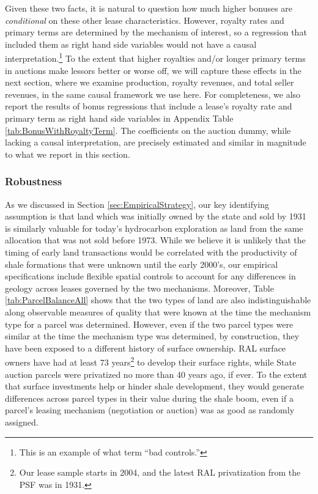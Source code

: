 \documentclass[12pt]{article}
\begin{document}
Given these two facts, it is natural to question how much higher bonuses are \emph{conditional} on these other lease characteristics. However, royalty rates and primary terms are determined by the mechanism of interest, so a regression that included them as right hand side variables would not have a causal interpretation.\footnote{This is an example of what \citet{angrist2008mostly} term ``bad controls.''} To the extent that higher royalties and/or longer primary terms in auctions make lessors better or worse off, we will capture these effects in the next section, where we examine production, royalty revenues, and total seller revenues, in the same causal framework we use here.  For completeness, we also report the results of bonus regressions that include a lease's royalty rate and primary term as right hand side variables in Appendix Table \ref{tab:BonusWithRoyaltyTerm}.  The coefficients on the auction dummy, while lacking a causal interpretation, are precisely estimated and similar in magnitude to what we report in this section. 

\subsubsection*{Robustness \label{sec:BonusRobustness}}
As we discussed in Section \ref{sec:EmpiricalStrategy}, our key identifying assumption is that land which was initially owned by the state and sold by 1931 is similarly valuable for today's hydrocarbon exploration as land from the same allocation that was not sold before 1973. While we believe it is unlikely that the timing of early land transactions would be correlated with the productivity of shale formations that were unknown until the early 2000's, our empirical specifications include flexible spatial controls to account for any differences in geology across leases governed by the two mechanisms.  Moreover, Table \ref{tab:ParcelBalanceAll} shows that the two types of land are also indistinguishable along observable measures of quality that were known at the time the mechanism type for a parcel was determined.  However, even if the two parcel types were similar at the time the mechanism type was determined, by construction, they have been exposed to a different history of surface ownership.  RAL surface owners have had at least 73 years\footnote{Our lease sample starts in 2004, and the latest RAL privatization from the PSF was in 1931.} to develop their surface rights, while State auction parcels were privatized no more than 40 years ago, if ever. To the extent that surface investments help or hinder shale development, they would generate differences across parcel types in their value during the shale boom, even if a parcel's leasing mechanism (negotiation or auction) was as good as randomly assigned. 
\end{document}
